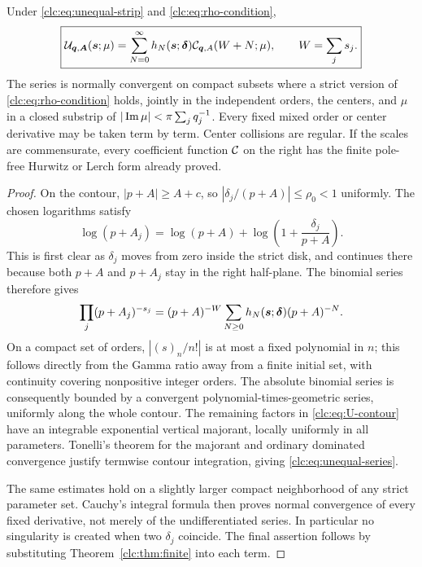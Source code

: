 \begin{theorem}
\label{clc:thm:unequal}
Under \eqref{clc:eq:unequal-strip} and \eqref{clc:eq:rho-condition},
\begin{equation}\label{clc:eq:unequal-series}
 \boxed{\displaystyle
 \mathcal U_{\boldsymbol q,\boldsymbol A}(\boldsymbol s;\mu)
 =\sum_{N=0}^\infty h_N(\boldsymbol s;\boldsymbol\delta)
                  \mathcal C_{\boldsymbol q,A}(W+N;\mu),\qquad W=\sum_js_j.}
\end{equation}
The series is normally convergent on compact subsets where a strict
version of \eqref{clc:eq:rho-condition} holds, jointly in the independent
orders, the centers, and $\mu$ in a closed substrip of
$|\operatorname{Im}\mu|<\pi\sum_jq_j^{-1}$. Every fixed mixed order or center
derivative may be taken term by term. Center collisions are regular.
If the scales are commensurate, every coefficient function $\mathcal C$ on the
right has the finite pole-free Hurwitz or Lerch form already proved.
\end{theorem}
\begin{proof}
On the contour, $|p+A|\ge A+c$, so
$|\delta_j/(p+A)|\le\rho_0<1$ uniformly. The chosen logarithms satisfy
\[
 \log(p+A_j)=\log(p+A)+
             \log\left(1+\frac{\delta_j}{p+A}\right).
\]
This is first clear as $\delta_j$ moves from zero inside the strict disk,
and continues there because both $p+A$ and $p+A_j$ stay in the right
half-plane. The binomial series therefore gives
\[
 \prod_j(p+A_j)^{-s_j}
 =(p+A)^{-W}\sum_{N\ge0}h_N(\boldsymbol s;\boldsymbol\delta)(p+A)^{-N}.
\]
On a compact set of orders, $|(s)_n/n!|$ is at most a fixed polynomial
in $n$; this follows directly from the Gamma ratio away from a finite
initial set, with continuity covering nonpositive integer orders.
The absolute binomial series is consequently bounded by a convergent
polynomial-times-geometric series, uniformly along the whole contour.
The remaining factors in \eqref{clc:eq:U-contour} have an integrable
exponential vertical majorant, locally uniformly in all parameters.
Tonelli's theorem for the majorant and ordinary dominated convergence
justify termwise contour integration, giving \eqref{clc:eq:unequal-series}.

The same estimates hold on a slightly larger compact neighborhood of
any strict parameter set. Cauchy's integral formula then proves normal
convergence of every fixed derivative, not merely of the undifferentiated
series. In particular no singularity is created when two $\delta_j$
coincide. The final assertion follows by substituting
Theorem~\ref{clc:thm:finite} into each term.
\end{proof}

